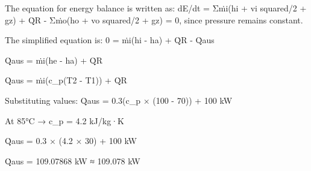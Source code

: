 The equation for energy balance is written as:  
dE/dt = Σṁi(hi + vi squared/2 + gz) + Q̇R - Σṁo(ho + vo squared/2 + gz) = 0, since pressure remains constant.  

The simplified equation is:  
0 = ṁi(hi - ha) + Q̇R - Q̇aus  

Q̇aus = ṁi(he - ha) + Q̇R  

Q̇aus = ṁi(c_p(T2 - T1)) + Q̇R  

Substituting values:  
Q̇aus = 0.3(c_p × (100 - 70)) + 100 kW  

At 85°C → c_p = 4.2 kJ/kg·K  

Q̇aus = 0.3 × (4.2 × 30) + 100 kW  

Q̇aus = 109.07868 kW ≈ 109.078 kW